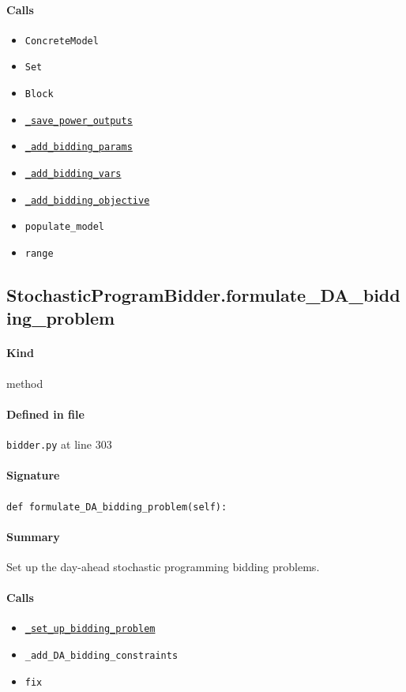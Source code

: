 \documentclass[11pt]{report}
\begin{document}
\paragraph{Calls}
\begin{itemize}[leftmargin=*]
  \item \texttt{ConcreteModel}
  \item \texttt{Set}
  \item \texttt{Block}
  \item \hyperref[def:bidder.py:StochasticProgramBidder._save_power_outputs:L339]{\texttt{\_save\_power\_outputs}}
  \item \hyperref[def:bidder.py:StochasticProgramBidder._add_bidding_params:L360]{\texttt{\_add\_bidding\_params}}
  \item \hyperref[def:bidder.py:StochasticProgramBidder._add_bidding_vars:L385]{\texttt{\_add\_bidding\_vars}}
  \item \hyperref[def:bidder.py:StochasticProgramBidder._add_bidding_objective:L418]{\texttt{\_add\_bidding\_objective}}
  \item \texttt{populate\_model}
  \item \texttt{range}
\end{itemize}
\subsection{StochasticProgramBidder.formulate\_DA\_bidding\_problem}
\label{def:bidder.py:StochasticProgramBidder.formulate_DA_bidding_problem:L303}
\paragraph{Kind} method
\paragraph{Defined in file} \texttt{bidder.py} at line 303
\paragraph{Signature} \texttt{def formulate\_DA\_bidding\_problem(self):}
\paragraph{Summary} Set up the day-ahead stochastic programming bidding problems.
\paragraph{Calls}
\begin{itemize}[leftmargin=*]
  \item \hyperref[def:bidder.py:StochasticProgramBidder._set_up_bidding_problem:L275]{\texttt{\_set\_up\_bidding\_problem}}
  \item \texttt{\_add\_DA\_bidding\_constraints}
  \item \texttt{fix}
\end{itemize}
\end{document}
